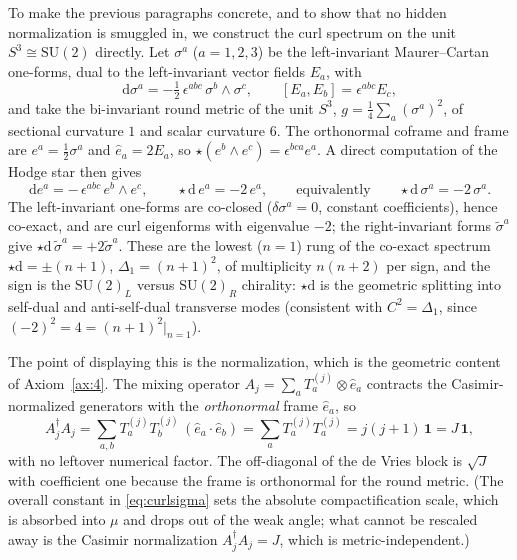 \documentclass[11pt]{article}
\theoremstyle{plain}
\theoremstyle{definition}
\newcommand{\dd}{\mathrm{d}}
\newcommand{\SU}{\mathrm{SU}}
\begin{document}
To make the previous paragraphs concrete, and to show that no hidden
normalization is smuggled in, we construct the curl spectrum on the
unit $S^3\cong\SU(2)$ directly. Let $\sigma^a$ ($a=1,2,3$) be the
left-invariant Maurer--Cartan one-forms, dual to the left-invariant vector
fields $E_a$, with
\begin{equation}
\dd\sigma^a=-\tfrac12\,\epsilon^{abc}\,\sigma^b\wedge\sigma^c,
\qquad
[E_a,E_b]=\epsilon^{abc}E_c,
\end{equation}
and take the bi-invariant round metric of the unit $S^3$,
$g=\tfrac14\sum_a(\sigma^a)^2$, of sectional curvature $1$ and scalar
curvature $6$. The orthonormal coframe and frame are
$e^a=\tfrac12\sigma^a$ and $\hat e_a=2E_a$, so $\star(e^b\wedge e^c)=
\epsilon^{bca}e^a$. A direct computation of the Hodge star then gives
\begin{equation}
\dd e^a=-\,\epsilon^{abc}\,e^b\wedge e^c,
\qquad
\star\dd\,e^a=-2\,e^a,
\qquad\text{equivalently}\qquad
\star\dd\,\sigma^a=-2\,\sigma^a.
\label{eq:curlsigma}
\end{equation}
The left-invariant one-forms are co-closed ($\delta\sigma^a=0$, constant
coefficients), hence co-exact, and are curl eigenforms with eigenvalue $-2$;
the right-invariant forms $\tilde\sigma^a$ give $\star\dd\,\tilde\sigma^a=+2
\tilde\sigma^a$. These are the lowest ($n=1$) rung of the co-exact spectrum
$\star\dd=\pm(n+1)$, $\Delta_1=(n+1)^2$, of multiplicity $n(n+2)$ per sign,
and the sign is the $\SU(2)_L$ versus $\SU(2)_R$ chirality: $\star\dd$ is the
geometric splitting into self-dual and anti-self-dual transverse modes
(consistent with $C^2=\Delta_1$, since $(-2)^2=4=(n+1)^2|_{n=1}$).

The point of displaying this is the normalization, which is the geometric
content of Axiom~\ref{ax:4}. The mixing operator
$A_j=\sum_aT_a^{(j)}\otimes\hat e_a$ contracts the Casimir-normalized
generators with the \emph{orthonormal} frame $\hat e_a$, so
\begin{equation}
A_j^\dagger A_j=\sum_{a,b}T_a^{(j)}T_b^{(j)}\,(\hat e_a\!\cdot\!\hat e_b)
=\sum_aT_a^{(j)}T_a^{(j)}=j(j+1)\,\bm1=J\,\bm1,
\end{equation}
with no leftover numerical factor. The off-diagonal of the de Vries block is
$\sqrt J$ with coefficient one because the frame is orthonormal for
the round metric. (The overall constant in \eqref{eq:curlsigma} sets the
absolute compactification scale, which is absorbed into $\mu$ and drops out of
the weak angle; what cannot be rescaled away is the Casimir normalization
$A_j^\dagger A_j=J$, which is metric-independent.)
\end{document}
